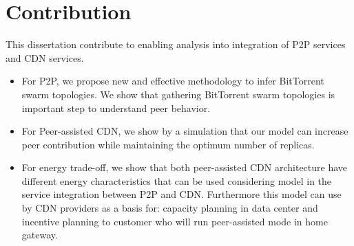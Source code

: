 \section{Contribution}
This dissertation  contribute to enabling analysis into integration of P2P services and CDN services.
\begin{itemize}
	\item For P2P, we propose new and effective methodology to infer BitTorrent swarm topologies. 
	We show that gathering BitTorrent swarm topologies is important step to understand peer behavior. 
	\item For Peer-assisted CDN, we show by a simulation that our model can increase peer contribution while maintaining the optimum number of replicas.
	\item For energy trade-off, we show that both peer-assisted CDN architecture have different energy characteristics that can be used considering model in the service integration between P2P and CDN. 
	Furthermore this model can use by CDN providers as a basis for: capacity planning in data center and incentive planning to customer who will run peer-assisted mode in home gateway.
\end{itemize}
